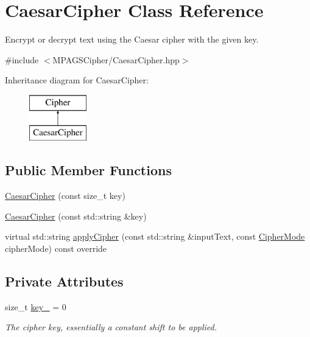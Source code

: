 \hypertarget{class_caesar_cipher}{}\section{Caesar\+Cipher Class Reference}
\label{class_caesar_cipher}


Encrypt or decrypt text using the Caesar cipher with the given key.  




{\ttfamily \#include $<$M\+P\+A\+G\+S\+Cipher/\+Caesar\+Cipher.\+hpp$>$}

Inheritance diagram for Caesar\+Cipher\+:\begin{figure}[H]
\begin{center}
\leavevmode
\includegraphics[height=2.000000cm]{class_caesar_cipher}
\end{center}
\end{figure}
\subsection*{Public Member Functions}
\begin{DoxyCompactItemize}
\item 
\hyperlink{class_caesar_cipher_afd5bb88c0e74234e76ad96b12d902931}{Caesar\+Cipher} (const size\+\_\+t key)
\item 
\hyperlink{class_caesar_cipher_a041ad5a8ef2b9e064a72fe64c9a97f4f}{Caesar\+Cipher} (const std\+::string \&key)
\item 
virtual std\+::string \hyperlink{class_caesar_cipher_ad9c70da70e7c465189ab1750e97fae5d}{apply\+Cipher} (const std\+::string \&input\+Text, const \hyperlink{_cipher_mode_8hpp_ac3adaabf9bad553901589ddf3de6daf5}{Cipher\+Mode} cipher\+Mode) const override
\end{DoxyCompactItemize}
\subsection*{Private Attributes}
\begin{DoxyCompactItemize}
\item 
size\+\_\+t \hyperlink{class_caesar_cipher_a7c29ddf093a91b51c91d977dcf57e7c3}{key\+\_\+} = 0\hypertarget{class_caesar_cipher_a7c29ddf093a91b51c91d977dcf57e7c3}{}\label{class_caesar_cipher_a7c29ddf093a91b51c91d977dcf57e7c3}

\begin{DoxyCompactList}\small\item\em The cipher key, essentially a constant shift to be applied. \end{DoxyCompactList}\end{DoxyCompactItemize}



